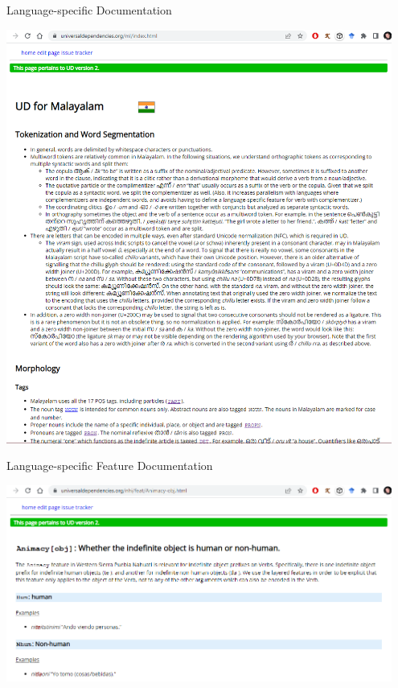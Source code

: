 \documentclass[10pt, compress, aspectratio=169]{beamer}
\begin{document}
\begin{frame}{Language-specific Documentation}
  \begin{center}
    \includegraphics[width=0.95\textwidth]{images/docs-ml-index.png}
  \end{center}
\end{frame}


\begin{frame}{Language-specific Feature Documentation}
  \begin{center}
    \includegraphics[width=0.95\textwidth]{images/docs-nhi-animacy-obj.png}
  \end{center}
\end{frame}
\end{document}
